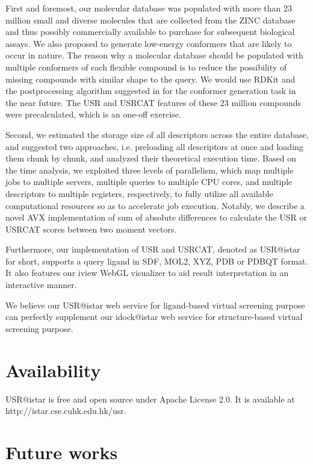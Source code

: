 First and foremost, our molecular database was populated with more than 23 million small and diverse molecules that are collected from the ZINC database \citep{532,1178} and thus possibly commercially available to purchase for subsequent biological assays. We also proposed to generate low-energy conformers that are likely to occur in nature. The reason why a molecular database should be populated with multiple conformers of each flexible compound is to reduce the possibility of missing compounds with similar shape to the query. We would use RDKit and the postprocessing algorithm suggested in \citep{1127} for the conformer generation task in the near future. The USR and USRCAT features of these 23 million compounds were precalculated, which is an one-off exercise.

Second, we estimated the storage size of all descriptors across the entire database, and suggested two approaches, i.e. preloading all descriptors at once and loading them chunk by chunk, and analyzed their theoretical execution time. Based on the time analysis, we exploited three levels of parallelism, which map multiple jobs to multiple servers, multiple queries to multiple CPU cores, and multiple descriptors to multiple registers, respectively, to fully utilize all available computational resources so as to accelerate job execution. Notably, we describe a novel AVX implementation of sum of absolute differences to calculate the USR or USRCAT scores between two moment vectors.

Furthermore, our implementation of USR and USRCAT, denoted as USR@istar for short, supports a query ligand in SDF, MOL2, XYZ, PDB or PDBQT format. It also features our iview \citep{1366} WebGL visualizer to aid result interpretation in an interactive manner.

We believe our USR@istar web service for ligand-based virtual screening purpose can perfectly supplement our idock@istar web service for structure-based virtual screening purpose.

\section{Availability}

USR@istar is free and open source under Apache License 2.0. It is available at http://istar.cse.cuhk.edu.hk/usr.

\section{Future works}

